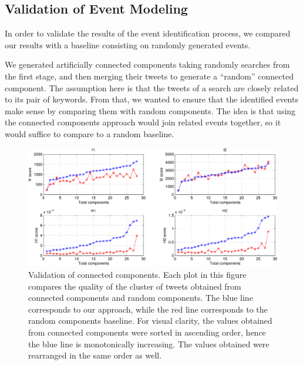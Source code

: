 \subsection{Validation of Event Modeling}\label{sub:valcoll}

In order to validate the results of the event identification process, we
compared our results with a baseline consisting on randomly generated events.

We generated artificially connected components taking randomly searches from the
first stage, and then merging their tweets to generate a ``random'' connected
component. 
%
The assumption here is that the tweets of a search are closely related to its
pair of keywords. 
%
From that, we wanted to ensure that the identified events make sense by
comparing them with random components. 
%
The idea is that using the connected components approach would join related
events together, so it would suffice to compare to a random baseline.

\begin{figure}
\begin{center}
\includegraphics[width=.8\textwidth]{figures/data/connected_components_validation2.pdf}
\caption[Validation of connected components] {Validation of connected
  components. Each plot in this figure compares the quality of the cluster of
  tweets obtained from connected components and random components. The blue line
  corresponds to our approach, while the red line corresponds to the random
  components baseline. For visual clarity, the values obtained from connected
  components were sorted in ascending order, hence the blue line is
  monotonically increasing. The values obtained were rearranged in the same
  order as well.}\label{fig:connected_components_validation} 
\end{center}
\end{figure}

